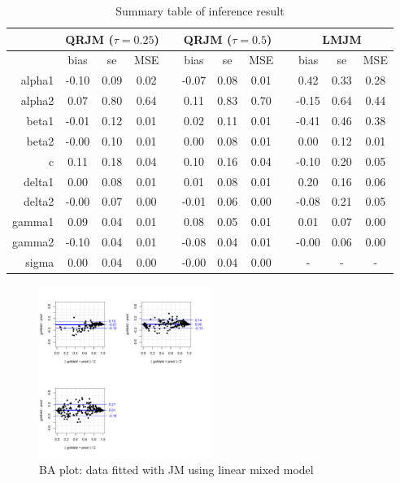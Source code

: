 \documentclass{article}
\begin{document}
\begin{table}[H]
\centering
\caption{Summary table of inference result}
\begin{tabular}{rccccccccccc}
\hline
& \multicolumn{3}{c}{QRJM ($\tau=0.25$)} & &\multicolumn{3}{c}{QRJM ($\tau=0.5$)} & & \multicolumn{3}{c}{LMJM}\\
\hline
 & bias & se & MSE & & bias & se & MSE & & bias & se & MSE \\
 \cline{2-4}  \cline{6-8}  \cline{10-12}
  alpha1 & -0.10 & 0.09 & 0.02 & & -0.07 & 0.08 & 0.01 & & 0.42 & 0.33 & 0.28 \\
  alpha2 & 0.07 & 0.80 & 0.64 & & 0.11 & 0.83 & 0.70 & & -0.15 & 0.64 & 0.44 \\
  beta1 & -0.01 & 0.12 & 0.01 & & 0.02 & 0.11 & 0.01 & & -0.41 & 0.46 & 0.38 \\
  beta2 & -0.00 & 0.10 & 0.01 & & 0.00 & 0.08 & 0.01 & & 0.00 & 0.12 & 0.01 \\
  c & 0.11 & 0.18 & 0.04 & & 0.10 & 0.16 & 0.04 & & -0.10 & 0.20 & 0.05 \\
  delta1 & 0.00 & 0.08 & 0.01 & & 0.01 & 0.08 & 0.01 & & 0.20 & 0.16 & 0.06 \\
  delta2 & -0.00 & 0.07 & 0.00 & & -0.01 & 0.06 & 0.00 & & -0.08 & 0.21 & 0.05 \\
  gamma1 & 0.09 & 0.04 & 0.01 & & 0.08 & 0.05 & 0.01 & & 0.01 & 0.07 & 0.00 \\
  gamma2 & -0.10 & 0.04 & 0.01 & & -0.08 & 0.04 & 0.01 & & -0.00 & 0.06 & 0.00 \\
  sigma & 0.00 & 0.04 & 0.00 & & -0.00 & 0.04 & 0.00 & & - & - & - \\
   \hline
\end{tabular}
\end{table}

\begin{figure}[H]
\centering
\includegraphics[width=0.5\textwidth]{ba_LMJM_qt25.pdf}
\caption{BA plot: data fitted with JM using linear mixed model}
\end{figure}
\end{document}
